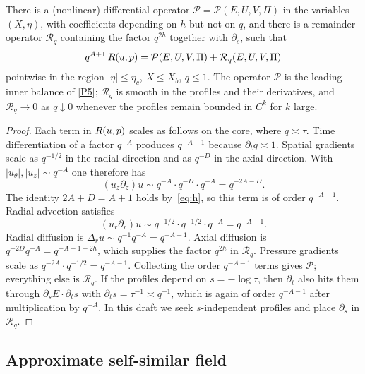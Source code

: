 \begin{lemma}
\label{lem:rescaled-op}
There is a (nonlinear) differential operator $\mathcal P=\mathcal P(E,U,V,\Pi)$ in the variables $(X,\eta)$, with coefficients depending on $h$ but not on $q$, and there is a remainder operator $\mathcal R_q$ containing the factor $q^{2h}$ together with $\partial_s$, such that
\begin{equation}
\label{eq:rescaled-op}
q^{A+1}\,R(u,p)
=\mathcal P(E,U,V,\Pi)
+\mathcal R_q(E,U,V,\Pi)
\end{equation}
pointwise in the region $|\eta|\le\eta_c$, $X\le X_b$, $q\le 1$. The operator $\mathcal P$ is the leading inner balance of \ref{P5}; $\mathcal R_q$ is smooth in the profiles and their derivatives, and $\mathcal R_q\to 0$ as $q\downarrow 0$ whenever the profiles remain bounded in $C^k$ for $k$ large.
\end{lemma}

\begin{proof}
Each term in $R(u,p)$ scales as follows on the core, where $q\asymp\tau$. Time differentiation of a factor $q^{-A}$ produces $q^{-A-1}$ because $\partial_t q\asymp 1$. Spatial gradients scale as $q^{-1/2}$ in the radial direction and as $q^{-D}$ in the axial direction. With $|u_\theta|,|u_z|\sim q^{-A}$ one therefore has
\[
(u_z\partial_z)u\sim q^{-A}\cdot q^{-D}\cdot q^{-A}=q^{-2A-D}.
\]
The identity $2A+D=A+1$ holds by~\eqref{eq:h}, so this term is of order $q^{-A-1}$. Radial advection satisfies
\[
(u_r\partial_r)u\sim q^{-1/2}\cdot q^{-1/2}\cdot q^{-A}=q^{-A-1}.
\]
Radial diffusion is $\Delta_r u\sim q^{-1}q^{-A}=q^{-A-1}$. Axial diffusion is $q^{-2D}q^{-A}=q^{-A-1+2h}$, which supplies the factor $q^{2h}$ in $\mathcal R_q$. Pressure gradients scale as $q^{-2A}\cdot q^{-1/2}=q^{-A-1}$. Collecting the order $q^{-A-1}$ terms gives $\mathcal P$; everything else is $\mathcal R_q$. If the profiles depend on $s=-\log\tau$, then $\partial_t$ also hits them through $\partial_s E\cdot\partial_t s$ with $\partial_t s=\tau^{-1}\asymp q^{-1}$, which is again of order $q^{-A-1}$ after multiplication by $q^{-A}$. In this draft we seek $s$-independent profiles and place $\partial_s$ in $\mathcal R_q$.
\end{proof}

\subsection{Approximate self-similar field}
\label{sec:approx-ss}

